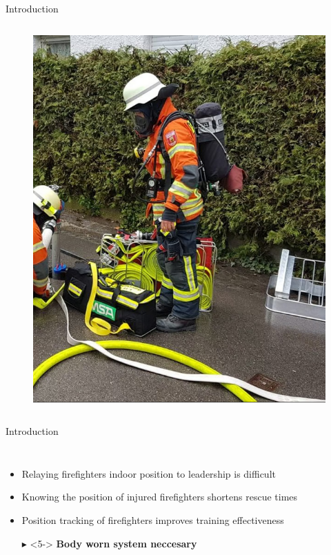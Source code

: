 \documentclass[aspectratio=169,handout]{beamer}
\begin{document}
{\begin{frame}{Introduction}
\begin{columns}
			\begin{figure}
				\centering
				\includegraphics[height=0.7\textheight]{firefighter.png}
			\end{figure}
			
		\end{columns}
		
		
	\end{frame}
	
	\begin{frame}{Introduction}
			\begin{columns}
				\begin{itemize}
					\item<2-> Relaying firefighters indoor position to leadership is difficult
					\item<3-> Knowing the position of injured firefighters shortens rescue times
					\item<4-> Position tracking of firefighters improves training effectiveness
					\item[$\blacktriangleright$]<5-> \textbf{Body worn system neccesary}
				\end{itemize}
		

\end{columns}
\end{frame}}
\end{document}
